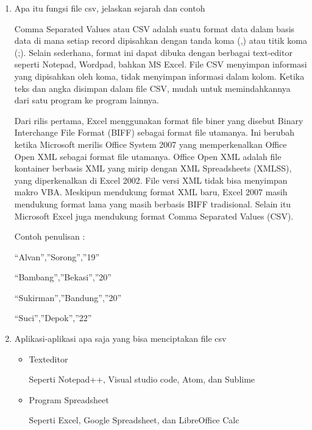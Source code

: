 \begin{enumerate}
    \item Apa itu fungsi file csv, jelaskan sejarah dan contoh
    \par Comma Separated Values atau CSV adalah suatu format data dalam basis data di mana setiap record dipisahkan dengan tanda koma (,) atau titik koma (;). Selain sederhana, format ini dapat dibuka dengan berbagai text-editor seperti Notepad, Wordpad, bahkan MS Excel. File CSV menyimpan informasi yang dipisahkan oleh koma, tidak menyimpan informasi dalam kolom. Ketika teks dan angka disimpan dalam file CSV, mudah untuk memindahkannya dari satu program ke program lainnya.
    \par Dari rilis pertama, Excel menggunakan format file biner yang disebut Binary Interchange File Format (BIFF) sebagai format file utamanya. Ini berubah ketika Microsoft merilis Office System 2007 yang memperkenalkan Office Open XML sebagai format file utamanya. Office Open XML adalah file kontainer berbasis XML yang mirip dengan XML Spreadsheets (XMLSS), yang diperkenalkan di Excel 2002. File versi XML tidak bisa menyimpan makro VBA. Meskipun mendukung format XML baru, Excel 2007 masih mendukung format lama yang masih berbasis BIFF tradisional. Selain itu Microsoft Excel juga mendukung format Comma Separated Values (CSV).
    \par Contoh penulisan :
    \par “Alvan”,”Sorong”,”19”
    \par “Bambang”,”Bekasi”,”20”
    \par “Sukirman”,”Bandung”,”20”
    \par “Suci”,”Depok”,”22”

    \item Aplikasi-aplikasi apa saja yang bisa menciptakan file csv
    \begin{itemize}
        \item Texteditor
        \par Seperti Notepad++, Visual studio code, Atom, dan Sublime
        \item Program Spreadsheet
        \par Seperti Excel, Google Spreadsheet, dan LibreOffice Calc
    \end{itemize}
    

\end{enumerate}
